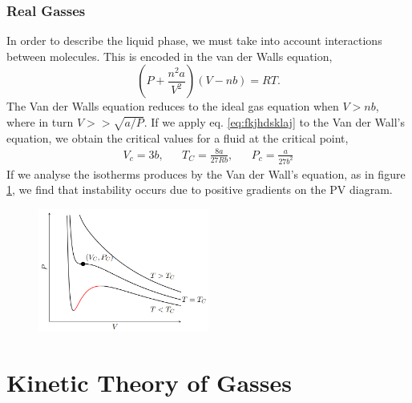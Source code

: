 \documentclass{book}
\begin{document}
\subsection{Real Gasses}
In order to describe the liquid phase, we must take into account interactions between molecules. This is encoded in the van der Walls equation,
\begin{equation}
	\boxed{\left(P + \frac{n^2a}{V^2}\right)\left(V - nb\right) = RT}.
\end{equation}
The Van der Walls equation reduces to the ideal gas equation when $V > nb$, where in turn $V >> \sqrt{a/P}$. If we apply eq. \eqref{eq:fkjhdsklaj} to the Van der Wall's equation, we obtain the critical values for a fluid at the critical point,
\begin{align}
	V_c = 3b, && T_C = \frac{8a}{27Rb}, && P_c = \frac{a}{27b^2}
\end{align}
If we analyse the isotherms produces by the Van der Wall's equation, as in figure \ref{fig:pv van}, we find that instability occurs due to positive gradients on the PV diagram.
\begin{figure}
	\centering
	\includegraphics[width=0.5\textwidth]{pv van.png}
	\caption{}
	\label{fig:pv van}
\end{figure}
\chapter{Kinetic Theory of Gasses}
\end{document}

